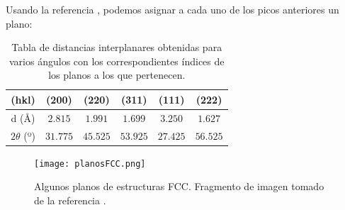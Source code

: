 \documentclass{beamer}
\begin{document}
\begin{frame}
    Usando la referencia \cite{difArticle}, podemos asignar a cada uno de los picos anteriores un plano:
    \begin{table}
        \begin{center}
            \begin{tabular}{|c|c|c|c|c|c|}
                \hline
                (hkl) & (200) & (220) & (311) & (111) & (222) \\ \hline
                d (\r{A}) & $2.815$ & $1.991$ & $1.699$ & $3.250$ & $1.627$ \\ \hline
                $2\theta$ (º) & $31.775$ & $45.525$ & $53.925$ & $27.425$ & $56.525$ \\ \hline
            \end{tabular}
        \end{center}
        \caption{Tabla de distancias interplanares obtenidas para varios ángulos con los correspondientes índices de los planos a los que pertenecen.}
    \end{table}
    \begin{figure}[h!]
        \begin{center}
            \texttt{[image: planosFCC.png]}
        \end{center}
        \caption{Algunos planos de estructuras FCC. Fragmento de imagen tomado de la referencia \cite{fccPlanes}.}
    \end{figure}
\end{frame}
\end{document}
